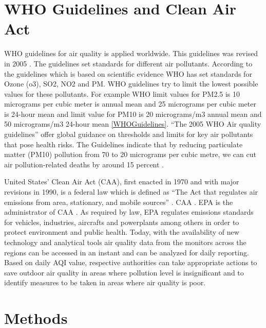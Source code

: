 \documentclass[sigconf]{acmart}
\begin{document}
\section{WHO Guidelines and Clean Air Act}
   WHO guidelines for air quality is applied worldwide. This guidelines was revised in 2005 \cite{www-who}. The guidelines set standards for different air pollutants. According to the guidelines which is based on scientific evidence WHO has set standards for Ozone (o3), SO2, NO2 and PM. WHO guidelines try to limit the lowest possible values for these pollutants. For example WHO limit values for PM2.5 is 10 micrograms per cubic meter is annual mean and 25 micrograms per cubic meter is 24-hour mean and limit value for PM10 is 20 micrograms/m3 annual mean and 50 micrograms/m3 24-hour mean \cite{www-who} \ref{WHOGuidelines}. ``The 2005 WHO Air quality guidelines'' offer global guidance on thresholds and limits for key air pollutants that pose health risks. The Guidelines indicate that by reducing particulate matter (PM10) pollution from 70 to 20 micrograms per cubic metre, we can cut air pollution-related deaths by around 15 percent \cite{www-who}.

   United States' Clean Air Act (CAA), first enacted in 1970 and with major revisions in 1990, is a federal law which is defined as ``The Act that regulates air emissions from area, stationary, and mobile sources'' \cite{epa-gov}. CAA  . EPA is the administrator of CAA \cite{wikipedia-org}. As required by law, EPA regulates emissions standards for vehicles, industries, aircrafts and powerplants among others in order to protect environment and public health. Today, with the availability of new technology and analytical tools air quality data from the monitors across the regions can be accessed in an instant and can be analyzed for daily reporting.
   Based on daily AQI value, respective authorities can take appropriate actions to save outdoor air quality in areas where pollution level is insignificant and to identify measures to be taken in areas where air quality is poor.

\section{Methods}
\end{document}
